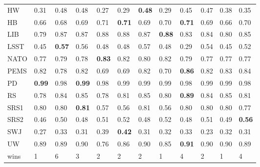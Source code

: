 \begin{table}
\begin{tabular}{p{0.6cm}*{11}{p{0.55cm}}}
     HW &          0.31 &          0.48 &          0.48 &          0.27 &          0.29 & \textbf{0.48} &          0.29 &          0.45 &          0.47 &          0.38 &          0.35 \\
     HB &          0.66 &          0.68 &          0.69 &          0.71 & \textbf{0.71} &          0.69 &          0.70 & \textbf{0.71} &          0.69 &          0.66 &          0.70 \\
    LIB &          0.79 &          0.87 &          0.87 &          0.88 &          0.88 &          0.87 & \textbf{0.88} &          0.83 &          0.84 &          0.80 &          0.85 \\
   LSST &          0.45 & \textbf{0.57} &          0.56 &          0.48 &          0.48 &          0.57 &          0.48 &          0.29 &          0.54 &          0.45 &          0.52 \\
   NATO &          0.77 &          0.79 &          0.78 & \textbf{0.83} &          0.82 &          0.80 &          0.82 &          0.79 &          0.77 &          0.77 &          0.77 \\
   PEMS &          0.82 &          0.78 &          0.82 &          0.69 &          0.69 &          0.82 &          0.70 & \textbf{0.86} &          0.82 &          0.83 &          0.84 \\
     PD & \textbf{0.99} &          0.98 & \textbf{0.99} &          0.98 &          0.99 &          0.99 &          0.99 &          0.98 &          0.99 &          0.99 &          0.98 \\
     RS &          0.78 &          0.84 &          0.85 &          0.78 &          0.81 &          0.85 &          0.80 & \textbf{0.89} &          0.84 &          0.85 &          0.81 \\
   SRS1 &          0.80 &          0.80 & \textbf{0.81} &          0.57 &          0.56 &          0.81 &          0.56 &          0.80 &          0.80 &          0.80 &          0.77 \\
   SRS2 &          0.46 &          0.50 &          0.48 &          0.51 &          0.52 &          0.48 &          0.52 &          0.48 &          0.51 &          0.49 & \textbf{0.56} \\
    SWJ &          0.27 &          0.33 &          0.31 &          0.39 & \textbf{0.42} &          0.31 &          0.32 &          0.33 &          0.23 &          0.32 &          0.31 \\
     UW &          0.89 &          0.89 &          0.90 &          0.76 &          0.86 &          0.90 &          0.85 & \textbf{0.91} &          0.90 &          0.90 &          0.89 \\
   wins &             1 &             6 &             3 &             2 &             2 &             2 &             1 &             4 &             2 &             1 &             4 \\
\bottomrule
\end{tabular}
\end{table}
